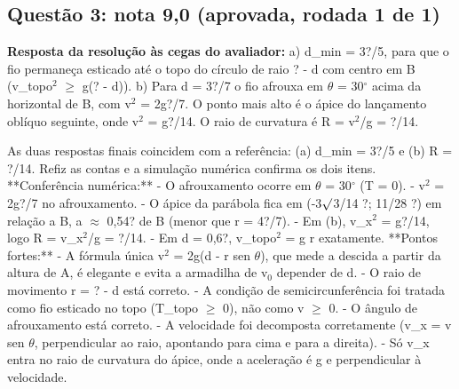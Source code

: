 \documentclass{article}%
\begin{document}
\subsection*{Questão 3: nota 9,0 (aprovada, rodada 1 de 1)}%
\textbf{Resposta da resolução às cegas do avaliador:} a) d\_min = 3?/5, para que o fio permaneça esticado até o topo do círculo de raio ? - d com centro em B (v\_topo$^2$ $\geq$ g(? - d)).\newline%
\newline%
b) Para d = 3?/7 o fio afrouxa em $\theta$ = 30$^\circ$ acima da horizontal de B, com v$^2$ = 2g?/7. O ponto mais alto é o ápice do lançamento oblíquo seguinte, onde v$^2$ = g?/14. O raio de curvatura é R = v$^2$/g = ?/14.\par %
As duas respostas finais coincidem com a referência: (a) d\_min = 3?/5 e (b) R = ?/14. Refiz as contas e a simulação numérica confirma os dois itens.\newline%
\newline%
**Conferência numérica:**\newline%
{-} O afrouxamento ocorre em $\theta$ = 30$^\circ$ (T = 0).\newline%
{-} v$^2$ = 2g?/7 no afrouxamento.\newline%
{-} O ápice da parábola fica em (-3$\surd$3/14 ?; 11/28 ?) em relação a B, a $\approx$ 0,54? de B (menor que r = 4?/7).\newline%
{-} Em (b), v\_x$^2$ = g?/14, logo R = v\_x$^2$/g = ?/14.\newline%
{-} Em d = 0,6?, v\_topo$^2$ = g r exatamente.\newline%
\newline%
**Pontos fortes:**\newline%
{-} A fórmula única v$^2$ = 2g(d - r sen $\theta$), que mede a descida a partir da altura de A, é elegante e evita a armadilha de v$_{0}$ depender de d.\newline%
{-} O raio de movimento r = ? - d está correto.\newline%
{-} A condição de semicircunferência foi tratada como fio esticado no topo (T\_topo $\geq$ 0), não como v $\geq$ 0.\newline%
{-} O ângulo de afrouxamento está correto.\newline%
{-} A velocidade foi decomposta corretamente (v\_x = v sen $\theta$, perpendicular ao raio, apontando para cima e para a direita).\newline%
{-} Só v\_x entra no raio de curvatura do ápice, onde a aceleração é g e perpendicular à velocidade.\newline%
\end{document}
